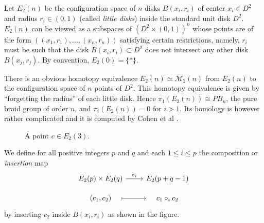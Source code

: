\documentclass[TFM.tex]{subfiles}
\begin{document}
 Let $E_2(n)$ be the configuration space of $n$ disks $B(x_i,r_i)$ of center $x_i\in D^2$ and radius $r_i\in (0,1)$ (called \emph{little disks}) inside the standard unit disk $D^2$. $E_2(n)$ can be viewed as a subspaces of $(D^2\times (0,1))^n$ whose points are of the form $((x_1,r_1),\dots, (x_n,r_n))$ satisfying certain restrictions, namely, $r_i$ must be such that the disk $B(x_i,r_i)\subset D^2$ does not intersect any other disk $B(x_j,r_j)$. By convention, $E_2(0)=\{*\}$.  
 
 There is an obvious homotopy equivalence $E_2(n)\simeq \mathcal{M}_2(n)$ from $E_2(n)$ to the configuration space of $n$ points of $D^2$. This homotopy equivalence is given by ``forgetting the radius'' of each little disk. %
   Hence $\pi_1(E_2(n))\cong PB_n$, the pure braid group of order $n$, and $\pi_i(E_2(n))=0$ for $i>1$. Its homology is however rather complicated and it is computed by Cohen et al \cite{cuentas}. 
 
 

\begin{figure}[h!]
\caption{A point $c\in E_2(3)$.}
 \end{figure}
 

 
 
 We define for all positive integers $p$ and $q$ and  each $1\leq i\leq p$ the composition or \emph{insertion} map 
 \[
 \begin{tikzcd}[row sep=10]
  E_2(p)\times E_2(q)\arrow[r, "\circ_i"] & E_2(p+q-1)\\
  (c_1,c_2)\arrow[r, mapsto, shorten <= 1em, shorten >= 1em] & c_1\circ_i c_2
 \end{tikzcd}
 \]
 by inserting $c_2$ inside $B(x_i,r_i)$ as shown in the figure. 
 
\end{document}
